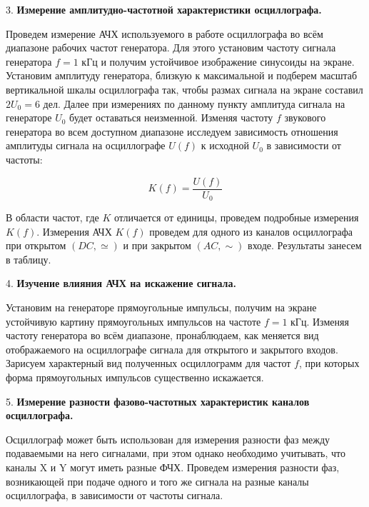 \documentclass[14pt]{article}
\begin{document}
%
%

\vspace{0.5cm}
3. \textbf{Измерение амплитудно-частотной характеристики осциллографа.} 

Проведем измерение АЧХ используемого в работе осциллографа во всём диапазоне рабочих частот генератора. Для этого установим частоту сигнала генератора $f = 1$ кГц и получим устойчивое изображение синусоиды на экране. Установим амплитуду генератора, близкую к максимальной и подберем масштаб вертикальной шкалы осциллографа так, чтобы размах сигнала на экране составил $2U_0 = 6$ дел. Далее при измерениях по данному пункту амплитуда сигнала на генераторе $U_0$ будет оставаться неизменной. Изменяя частоту $f$ звукового генератора во всем доступном диапазоне исследуем зависимость отношения амплитуды сигнала на осциллографе $U(f)$ к исходной $U_0$ в зависимости от частоты:

$$K(f) = \frac{U(f)}{U_0}$$

В области частот, где $K$ отличается от единицы, проведем подробные измерения $K(f)$. Измерения АЧХ $K(f)$ проведем для одного из каналов осциллографа при открытом $(DC, \simeq)$ и при закрытом $(AC, \sim)$ входе. Результаты занесем в таблицу.

%
%

%
%

\vspace{0.5cm}
4. \textbf{Изучение влияния АЧХ на искажение сигнала.}

Установим на генераторе прямоугольные импульсы, получим на экране устойчивую картину прямоугольных импульсов на частоте $f = 1$ кГц. Изменяя частоту генератора во всём диапазоне, пронаблюдаем, как меняется вид отображаемого на осциллографе сигнала для открытого и закрытого входов. Зарисуем характерный вид полученных осциллограмм для частот $f$, при которых форма прямоугольных импульсов существенно искажается. 

%
%

\vspace{0.5cm}
5. \textbf{Измерение разности фазово-частотных характеристик каналов осциллографа.}

Осциллограф может быть использован для измерения разности фаз между подаваемыми на него сигналами, при этом однако необходимо учитывать, что каналы X и Y могут иметь разные ФЧХ. Проведем измерения разности фаз, возникающей при подаче одного и того же сигнала на разные каналы осциллографа, в зависимости от частоты сигнала.
\end{document}
